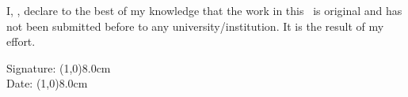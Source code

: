 I, \theStudentName, declare to the best of my knowledge that the work in this \theTheDocumentType~is original and has not been submitted before to any university/institution. It is the result of my effort.

\vspace{1.5cm}

Signature: \line(1,0){8.0cm} \\

\vspace{1.5cm}
Date:	\line(1,0){8.0cm}\par

